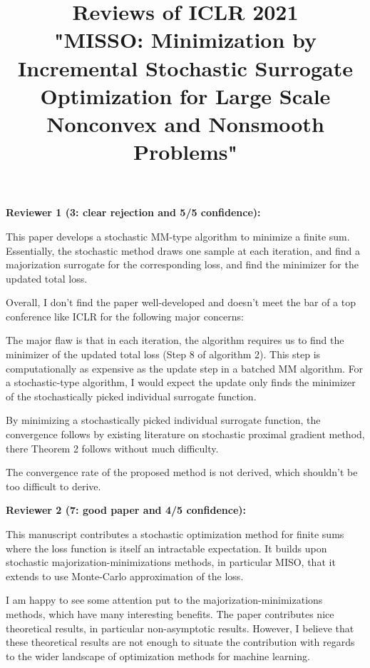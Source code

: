 \documentclass{article}
\begin{document}
\title{\textbf{Reviews of ICLR 2021}\\
"MISSO: Minimization by Incremental Stochastic Surrogate Optimization for Large Scale Nonconvex and Nonsmooth Problems"\\}


\date{}
\maketitle


\textbf{Reviewer 1 (3: clear rejection and 5/5 confidence):}

This paper develops a stochastic MM-type algorithm to minimize a finite sum. Essentially, the stochastic method draws one sample at each iteration, and find a majorization surrogate for the corresponding loss, and find the minimizer for the updated total loss.

Overall, I don't find the paper well-developed and doesn't meet the bar of a top conference like ICLR for the following major concerns:

The major flaw is that in each iteration, the algorithm requires us to find the minimizer of the updated total loss (Step 8 of algorithm 2). This step is computationally as expensive as the update step in a batched MM algorithm. For a stochastic-type algorithm, I would expect the update only finds the minimizer of the stochastically picked individual surrogate function.

By minimizing a stochastically picked individual surrogate function, the convergence follows by existing literature on stochastic proximal gradient method, there Theorem 2 follows without much difficulty.

The convergence rate of the proposed method is not derived, which shouldn't be too difficult to derive.



\textbf{Reviewer 2 (7: good paper and 4/5 confidence):}

This manuscript contributes a stochastic optimization method for finite sums where the loss function is itself an intractable expectation. It builds upon stochastic majorization-minimizations methods, in particular MISO, that it extends to use Monte-Carlo approximation of the loss.

I am happy to see some attention put to the majorization-minimizations methods, which have many interesting benefits. The paper contributes nice theoretical results, in particular non-asymptotic results. However, I believe that these theoretical results are not enough to situate the contribution with regards to the wider landscape of optimization methods for machine learning.
\end{document}
